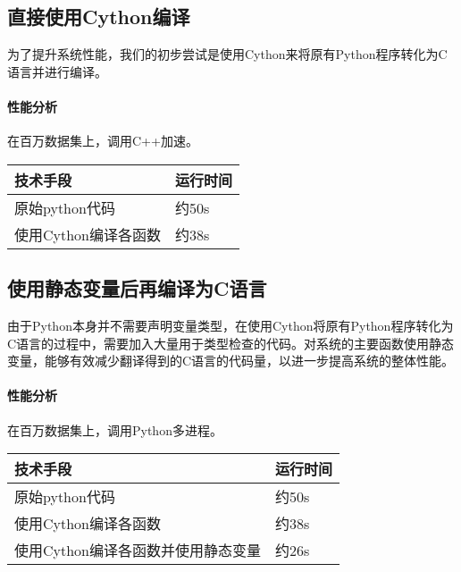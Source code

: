\subsection{直接使用Cython编译}
为了提升系统性能，我们的初步尝试是使用Cython来将原有Python程序转化为C语言并进行编译。
\paragraph{性能分析}在百万数据集上，调用C++加速。
\begin{table}[H]
\begin{adjustwidth}{-3cm}{-3cm}
\begin{center}
\begin{tabular}{|p{}| p{}|} \hline
技术手段 & 运行时间  \\ \hline
原始python代码 & 约50s  \\ \hline
使用Cython编译各函数 & 约38s  \\ \hline
\end{tabular}
\end{center}
\end{adjustwidth}
\end{table}


\subsection{使用静态变量后再编译为C语言}
由于Python本身并不需要声明变量类型，在使用Cython将原有Python程序转化为C语言的过程中，需要加入大量用于类型检查的代码。对系统的主要函数使用静态变量，能够有效减少翻译得到的C语言的代码量，以进一步提高系统的整体性能。

\paragraph{性能分析}在百万数据集上，调用Python多进程。
\begin{table}[H]
\begin{adjustwidth}{-3cm}{-3cm}
\begin{center}
\begin{tabular}{|p{}| p{}|} \hline
技术手段 & 运行时间  \\ \hline
原始python代码 & 约50s  \\ \hline
使用Cython编译各函数 & 约38s  \\ \hline
使用Cython编译各函数并使用静态变量 & 约26s\\ \hline
\end{tabular}
\end{center}
\end{adjustwidth}
\end{table}

